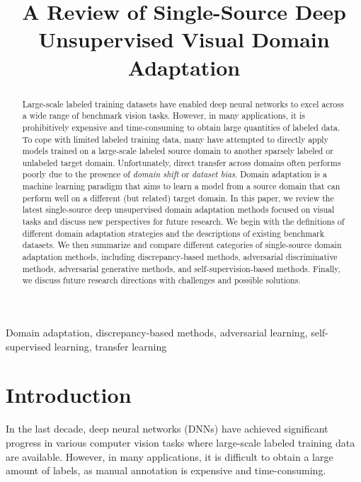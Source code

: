 \documentclass[conference]{IEEEtran}
\begin{document}
\title{A Review of Single-Source Deep Unsupervised Visual Domain Adaptation}

\author{
}

\maketitle

\begin{abstract}
Large-scale labeled training datasets have enabled deep neural networks to
excel across a wide range of benchmark vision tasks. However, in many
applications, it is prohibitively expensive and time-consuming to obtain
large quantities of labeled data. To cope with limited labeled training
data, many have attempted to directly apply models trained on a large-scale
labeled source domain to another sparsely labeled or unlabeled target domain.
Unfortunately, direct transfer across domains often performs poorly 
due to the presence of \textit{domain shift} or \textit{dataset bias}.
Domain adaptation is a machine learning paradigm that aims to learn a model from 
a source domain that can perform well on a different (but related) target domain.
In this paper, we review the latest single-source deep unsupervised 
domain adaptation methods focused on visual tasks and discuss new perspectives 
for future research. We begin with the definitions of different domain adaptation
strategies and the descriptions of existing benchmark datasets.
We then summarize and compare different categories of single-source domain 
adaptation methods, including discrepancy-based methods, adversarial 
discriminative methods, adversarial generative methods, and self-supervision-based
methods. Finally, we discuss future research directions with challenges and 
possible solutions. 
\end{abstract}

\begin{IEEEkeywords}
Domain adaptation, discrepancy-based methods, adversarial learning,
self-supervised learning, transfer learning
\end{IEEEkeywords}

\section{Introduction}
 In the last decade, deep neural networks (DNNs) have achieved significant 
 progress in various computer vision tasks where large-scale labeled 
 training data are available. However, in many applications, it is difficult
 to obtain a large amount of labels, as manual annotation is expensive and 
 time-consuming.
\end{document}
